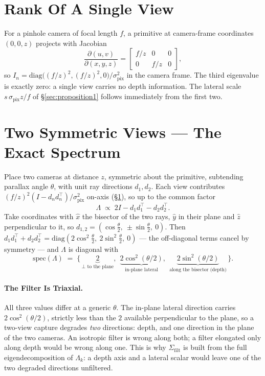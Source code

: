 \section{Rank Of A Single View}
\label{app:rank}
For a pinhole camera of focal length $f$, a primitive at camera-frame
coordinates $(0,0,z)$ projects with Jacobian
\begin{equation}
  \frac{\partial(u,v)}{\partial(x,y,z)} =
  \begin{bmatrix} f/z & 0 & 0 \\ 0 & f/z & 0 \end{bmatrix},
\end{equation}
so $I_n = \mathrm{diag}\big((f/z)^2, (f/z)^2, 0\big)/\sigma_{\mathrm{pix}}^2$ in
the camera frame. The third eigenvalue is exactly zero: a single view carries no
depth information. The lateral scale $s\,\sigma_{\mathrm{pix}}z/f$ of
\S\ref{sec:proposition1} follows immediately from the first two.

\section{Two Symmetric Views --- The Exact Spectrum}
\label{app:twoview}
Place two cameras at distance $z$, symmetric about the primitive, subtending
parallax angle $\theta$, with unit ray directions $d_1, d_2$. Each view
contributes $(f/z)^2(I - d_nd_n^{\!\top})/\sigma_{\mathrm{pix}}^2$ on-axis
(\S\ref{app:rank}), so up to the common factor
\begin{equation}
  \Lambda \;\propto\; 2I - d_1d_1^{\!\top} - d_2d_2^{\!\top}.
\end{equation}
Take coordinates with $\hat x$ the bisector of the two rays, $\hat y$ in their
plane and $\hat z$ perpendicular to it, so
$d_{1,2} = (\cos\tfrac\theta2,\ \pm\sin\tfrac\theta2,\ 0)$. Then
$d_1d_1^{\!\top} + d_2d_2^{\!\top} = \mathrm{diag}(2\cos^2\tfrac\theta2,\
2\sin^2\tfrac\theta2,\ 0)$ --- the off-diagonal terms cancel by symmetry --- and
$\Lambda$ is diagonal with
\begin{equation}
  \mathrm{spec}(\Lambda) \;=\;
  \big\{\,\underbrace{2}_{\perp\text{ to the plane}},\ \
  \underbrace{2\cos^2(\theta/2)}_{\text{in-plane lateral}},\ \
  \underbrace{2\sin^2(\theta/2)}_{\text{along the bisector (depth)}}\,\big\}.
  \label{eq:twoviewspectrum}
\end{equation}
\paragraph{The Filter Is Triaxial.} All three values differ
at a generic $\theta$. The in-plane lateral direction carries
$2\cos^2(\theta/2)$, strictly less than the $2$ available perpendicular to the
plane, so a two-view capture degrades \emph{two} directions: depth, and one direction
in the plane of the two cameras.
An isotropic filter is wrong along both; a filter elongated only along depth
would be wrong along one. This is why $\Sigma_{\mathrm{filt}}$ is built from the full eigendecomposition
of $\Lambda_k$: a depth axis and a lateral scalar would leave one of the two
degraded directions unfiltered.

